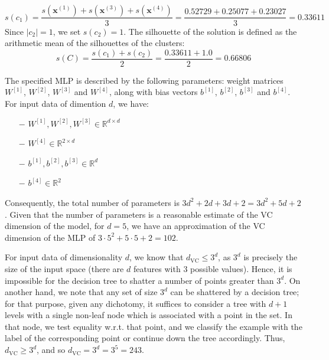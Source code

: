 \documentclass{exam}
\begin{document}
\begin{questions}
\begin{align*}
            \end{align*}
            \vspace{-2.2em}
            \[
                s(c_1) = \frac{ s(\textbf{x}^{(1)}) +  s(\textbf{x}^{(3)}) +  s(\textbf{x}^{(4)})}{3} = \frac{0.52729 + 0.25077 + 0.23027}{3} = 0.33611
            \]
            Since $|c_2| = 1$, we set $s(c_2) = 1$. The  silhouette of the solution is defined as the arithmetic mean of the silhouettes of the clusters:
            \vspace{1em}
            \[
                s(C) = \frac{s(c_1) + s(c_2)}{2} = \frac{0.33611 + 1.0}{2} = 0.66806
            \]
        \item \quad
        \begin{parts}
            \item \vspace{-1.6em}
            \begin{subparts}
                \item The specified MLP is described by the following parameters: weight matrices $W^{[1]}$, $W^{[2]}$, $W^{[3]}$ and $W^{[4]}$, along with bias vectors $b^{[1]}$, $b^{[2]}$, $b^{[3]}$ and $b^{[4]}$. For input data of dimention $d$, we have:
                \begin{itemize}
                    \vspace{0.6em}
                    \item[$-$] $W^{[1]}, W^{[2]}, W^{[3]} \in \mathbb{R}^{d \times d}$
                    \item[$-$] $W^{[4]} \in \mathbb{R}^{2 \times d}$
                    \item[$-$] $b^{[1]}, b^{[2]}, b^{[3]} \in \mathbb{R}^{d}$
                    \item[$-$] $b^{[4]} \in \mathbb{R}^{2}$
                \end{itemize} 
                \vspace{0.5em}
                Consequently, the total number of parameters is $3d^2 + 2d + 3d + 2 = 3d^2 + 5d + 2$. Given that the number of parameters is a reasonable estimate of the VC dimension of the model, for $d = 5$, we have an approximation of the VC dimension of the MLP of $3 \cdot 5^2 + 5 \cdot 5 + 2 = 102.$ 
                \vspace{0.8em}
                \item For input data of dimensionality $d$, we know that $d_{\text{VC}} \le 3^d$, as $3^d$ is precisely the size of the input space (there are $d$ features with 3 possible values). Hence, it is impossible for the decision tree to shatter a number of points greater than $3^d$. On another hand, we note that any set of size $3^d$ can be shattered by a decision tree; for that purpose, given any dichotomy, it suffices to consider a tree with $d + 1$ levels with a single non-leaf node which is associated with a point in the set. In that node, we test equality w.r.t. that point, and we classify the example with the label of the corresponding point or continue down the tree accordingly. Thus, $d_{\text{VC}} \ge 3^d$, and so $d_{\text{VC}} = 3^d = 3^5 = 243$.

\end{subparts}
\end{parts}
\end{questions}
\end{document}

